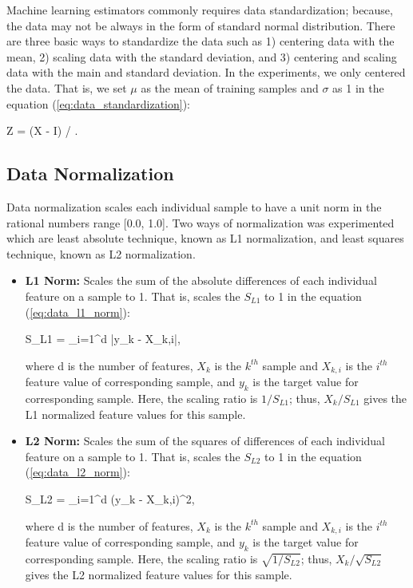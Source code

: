 Machine learning estimators commonly requires data standardization; because, the data may not be always in the form of standard normal distribution. There are three basic ways to standardize the data such as 1) centering data with the mean, 2) scaling data with the standard deviation, and 3) centering and scaling data with the main and standard deviation. In the experiments, we only centered the data. That is, we set $\mu$ as the mean of training samples and $\sigma$ as 1 in the equation (\ref{eq:data_standardization}):

\be
\label{eq:data_standardization}
Z = (X - \mu * I) / \sigma\:.
\ee

\subsection{Data Normalization}

Data normalization scales each individual sample to have a unit norm in the rational numbers range [0.0, 1.0]. Two ways of normalization was experimented which are least absolute technique, known as L1 normalization, and least squares technique, known as L2 normalization.

\begin{itemize}
    \item \textbf{L1 Norm:} Scales the sum of the absolute differences of each individual feature on a sample to 1. That is, scales the $S_{L1}$ to 1 in the equation (\ref{eq:data_l1_norm}):
    
    \be
    \label{eq:data_l1_norm}
    S_{L1} = \sum_{i=1}^{d} \big|y_{k} - X_{k,i}\big|\:,
    \ee
    
    where d is the number of features, $X_{k}$ is the $k^{th}$ sample and $X_{k,i}$ is the $i^{th}$ feature value of corresponding sample, and $y_{k}$ is the target value for corresponding sample. Here, the scaling ratio is $1 / S_{L1}$; thus, $X_{k} / S_{L1}$ gives the L1 normalized feature values for this sample.
    
    \item \textbf{L2 Norm:} Scales the sum of the squares of differences of each individual feature on a sample to 1. That is, scales the $S_{L2}$ to 1 in the equation (\ref{eq:data_l2_norm}):
    
    \be
    \label{eq:data_l2_norm}
    S_{L2} = \sum_{i=1}^{d} \big(y_{k} - X_{k,i}\big)^{2}\:,
    \ee
    
    where d is the number of features, $X_{k}$ is the $k^{th}$ sample and $X_{k,i}$ is the $i^{th}$ feature value of corresponding sample, and $y_{k}$ is the target value for corresponding sample. Here, the scaling ratio is $\sqrt{1 / S_{L2}}$; thus, $X_{k} / \sqrt{S_{L2}}$ gives the L2 normalized feature values for this sample.
\end{itemize}

